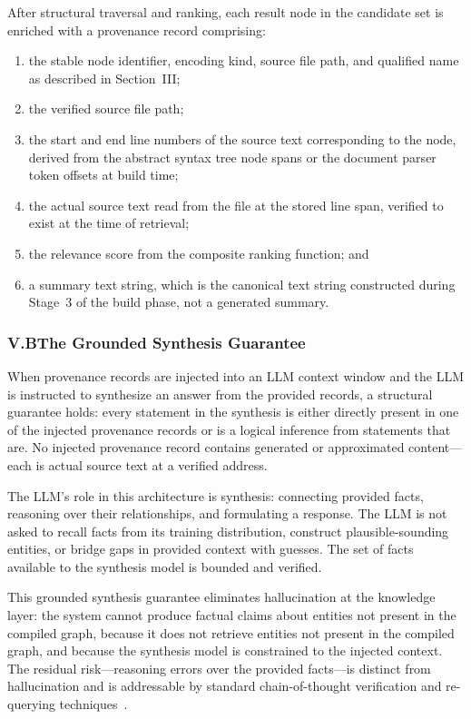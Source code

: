 \documentclass[12pt]{article}
\begin{document}
After structural traversal and ranking, each result node in the candidate set is
enriched with a provenance record comprising:
\begin{enumerate}[label=(\alph*), leftmargin=2em]
  \item the stable node identifier, encoding kind, source file path, and
    qualified name as described in Section~III;
  \item the verified source file path;
  \item the start and end line numbers of the source text corresponding to the
    node, derived from the abstract syntax tree node spans or the document parser
    token offsets at build time;
  \item the actual source text read from the file at the stored line span,
    verified to exist at the time of retrieval;
  \item the relevance score from the composite ranking function; and
  \item a summary text string, which is the canonical text string constructed
    during Stage~3 of the build phase, not a generated summary.
\end{enumerate}

\subsubsection{V.B\quad The Grounded Synthesis Guarantee}

When provenance records are injected into an LLM context window and the LLM is
instructed to synthesize an answer from the provided records, a structural
guarantee holds: every statement in the synthesis is either directly present in
one of the injected provenance records or is a logical inference from statements
that are. No injected provenance record contains generated or approximated
content---each is actual source text at a verified address.

The LLM's role in this architecture is synthesis: connecting provided facts,
reasoning over their relationships, and formulating a response. The LLM is not
asked to recall facts from its training distribution, construct
plausible-sounding entities, or bridge gaps in provided context with guesses.
The set of facts available to the synthesis model is bounded and verified.

This grounded synthesis guarantee eliminates hallucination at the knowledge
layer: the system cannot produce factual claims about entities not present in the
compiled graph, because it does not retrieve entities not present in the compiled
graph, and because the synthesis model is constrained to the injected context.
The residual risk---reasoning errors over the provided facts---is distinct from
hallucination and is addressable by standard chain-of-thought verification and
re-querying techniques~\cite{wei2022chainofthought, yao2023react}.
\end{document}
